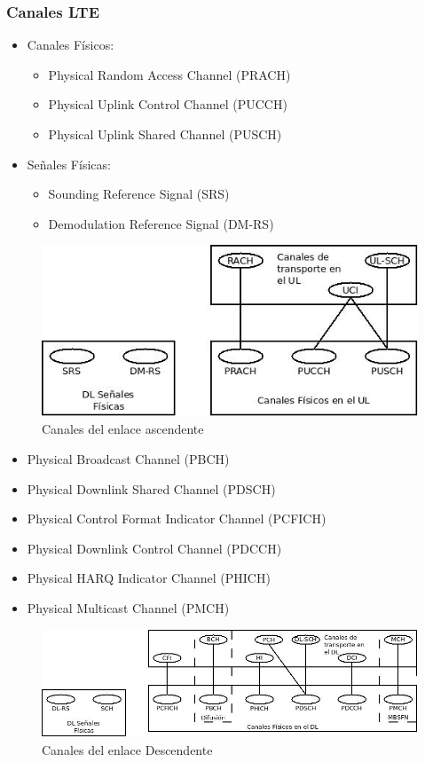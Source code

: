 	\subsubsection{Canales \acrshort{LTE}}
	\label{ssub:canalesLTE}
		\begin{itemize}
			\item Canales Físicos:
			\begin{itemize}			
				\item Physical Random Access Channel (\acrshort{PRACH})
				\item Physical Uplink Control Channel (\acrshort{PUCCH})
				\item Physical Uplink Shared Channel (\acrshort{PUSCH})
			\end{itemize}
			\item Señales Físicas:
			\begin{itemize}
				\item Sounding Reference Signal (\acrshort{SRS})
				\item Demodulation Reference Signal (\acrshort{DM-RS})
			\end{itemize}
		\end{itemize}
		\begin{figure}[H]
			\centering
			\includegraphics[width=\textwidth]{Imagen/canalesAscendente.jpg}
			\caption{Canales del enlace ascendente}
		\end{figure}
		\begin{itemize}
			\item Physical Broadcast Channel (\acrshort{PBCH})
			\item Physical Downlink Shared Channel (\acrshort{PDSCH})
			\item Physical Control Format Indicator Channel (\acrshort{PCFICH})
			\item Physical Downlink Control Channel (\acrshort{PDCCH})
			\item Physical HARQ Indicator Channel (\acrshort{PHICH})
			\item Physical Multicast Channel (\acrshort{PMCH})
		\end{itemize}
		\begin{figure}[H]
			\centering
			\includegraphics[width=\textwidth]{Imagen/canalesDescendente.jpg}
			\caption{Canales del enlace Descendente}
		\end{figure}
